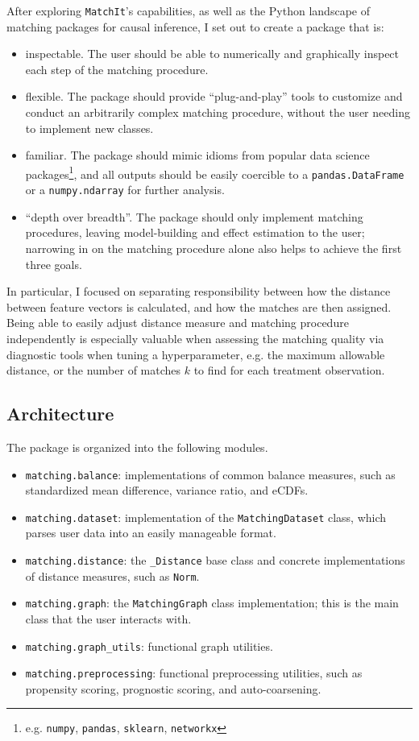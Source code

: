 \documentclass[11pt]{extarticle}
\begin{document}
After exploring \texttt{MatchIt}'s capabilities, as well as the Python landscape of matching packages for causal inference, I set out to create a package that is:
\begin{itemize}
  \item inspectable. The user should be able to numerically and graphically inspect each step of the matching procedure.
  \item flexible. The package should provide ``plug-and-play'' tools to customize and conduct an arbitrarily complex matching procedure, without the user needing to implement new classes.
  \item familiar. The package should mimic idioms from popular data science packages\footnote{e.g. \texttt{numpy}, \texttt{pandas}, \texttt{sklearn}, \texttt{networkx}}, and all outputs should be easily coercible to a \texttt{pandas.DataFrame} or a \texttt{numpy.ndarray} for further analysis.
  \item ``depth over breadth''. The package should only implement matching procedures, leaving model-building and effect estimation to the user; narrowing in on the matching procedure alone also helps to achieve the first three goals.
\end{itemize}
In particular, I focused on separating responsibility between how the distance between feature vectors is calculated, and how the matches are then assigned. Being able to easily adjust distance measure and matching procedure independently is especially valuable when assessing the matching quality via diagnostic tools when tuning a hyperparameter, e.g. the maximum allowable distance, or the number of matches $k$ to find for each treatment observation.

\subsection{Architecture}

The package is organized into the following modules.
\begin{itemize}
  \item \texttt{matching.balance}: implementations of common balance measures, such as standardized mean difference, variance ratio, and eCDFs.
  \item \texttt{matching.dataset}: implementation of the \texttt{MatchingDataset} class, which parses user data into an easily manageable format.
  \item \texttt{matching.distance}: the \texttt{\_Distance} base class and concrete implementations of distance measures, such as \texttt{Norm}.
  \item \texttt{matching.graph}: the \texttt{MatchingGraph} class implementation; this is the main class that the user interacts with.
  \item \texttt{matching.graph\_utils}: functional graph utilities.
  \item \texttt{matching.preprocessing}: functional preprocessing utilities, such as propensity scoring, prognostic scoring, and auto-coarsening.
\end{itemize}
\end{document}
